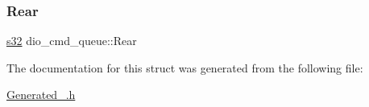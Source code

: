 \mbox{\label{structdio__cmd__queue_a5669f4099d38a9344b6e6ab1982b1822}} 
\subsubsection{\texorpdfstring{Rear}{Rear}}
{\footnotesize\ttfamily \hyperlink{ab__common_8h_ae9b1af5c037e57a98884758875d3a7c4}{s32} dio\+\_\+cmd\+\_\+queue\+::\+Rear}



The documentation for this struct was generated from the following file\+:\begin{DoxyCompactItemize}
\item 
\hyperlink{Generated__001_8h}{Generated\+\_.\+h}\end{DoxyCompactItemize}
